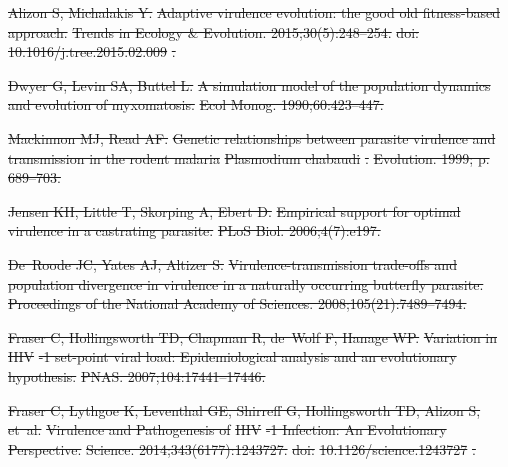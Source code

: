 \documentclass[10pt,letterpaper]{article}
\providecommand{\DIFdeltex}[1]{{\protect\color{red}\sout{#1}}}                      %
\providecommand{\DIFdel}[1]{\texorpdfstring{\DIFdeltex{#1}}{}} %
\begin{document}
\DIFdel{Alizon S, Michalakis Y.
}%
\DIFdel{Adaptive virulence evolution: the good old fitness-based approach.
}%
\DIFdel{Trends in Ecology \& Evolution. 2015;30(5):248--254.
}%
\DIFdel{doi:}%
\DIFdel{10.1016/j.tree.2015.02.009}%
\DIFdel{.
}%

\DIFdel{Dwyer G, Levin SA, Buttel L.
}%
\DIFdel{A simulation model of the population dynamics and evolution of
  myxomatosis.
}%
\DIFdel{Ecol Monog. 1990;60:423--447.
}%

\DIFdel{Mackinnon MJ, Read AF.
}%
\DIFdel{Genetic relationships between parasite virulence and transmission in
  the rodent malaria }%
\DIFdel{Plasmodium chabaudi}%
\DIFdel{.
}%
\DIFdel{Evolution. 1999; p. 689--703.
}%

\DIFdel{Jensen KH, Little T, Skorping A, Ebert D.
}%
\DIFdel{Empirical support for optimal virulence in a castrating parasite.
}%
\DIFdel{PLoS Biol. 2006;4(7):e197.
}%

\DIFdel{De~Roode JC, Yates AJ, Altizer S.
}%
\DIFdel{Virulence-transmission trade-offs and population divergence in
  virulence in a naturally occurring butterfly parasite.
}%
\DIFdel{Proceedings of the National Academy of Sciences. 2008;105(21):7489--7494.
}%

\DIFdel{Fraser C, Hollingsworth TD, Chapman R, de~Wolf F, Hanage WP.
}%
\DIFdel{Variation in }%
\DIFdel{HIV}%
\DIFdel{-1 set-point viral load: Epidemiological analysis
  and an evolutionary hypothesis.
}%
\DIFdel{PNAS. 2007;104:17441--17446.
}%

\DIFdel{Fraser C, Lythgoe K, Leventhal GE, Shirreff G, Hollingsworth TD, Alizon S,
  et~al.
}%
\DIFdel{Virulence and Pathogenesis of }%
\DIFdel{HIV}%
\DIFdel{-1 Infection: An Evolutionary
  Perspective.
}%
\DIFdel{Science. 2014;343(6177):1243727.
}%
\DIFdel{doi:}%
\DIFdel{10.1126/science.1243727}%
\DIFdel{.
}%
\end{document}
